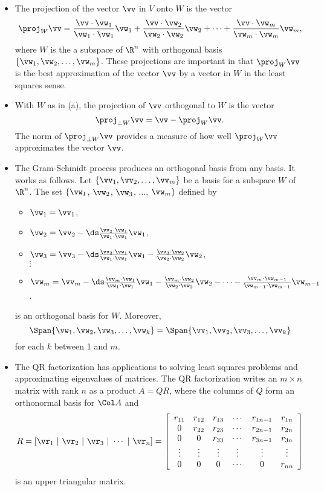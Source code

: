 \label{sec:gram_schmidt_summ}
\begin{itemize}
\item The projection of the vector $\vv$ in $V$ onto $W$ is the vector
\[\proj_W \vv = \frac{\vv \cdot \vw_1}{\vw_1 \cdot \vw_1} \vw_1 + \frac{\vv \cdot \vw_2}{\vw_2 \cdot \vw_2}  \vw_2 + \cdots + \frac{\vv \cdot \vw_m}{\vw_m \cdot \vw_m}  \vw_m,\]
where $W$ is the a subspace of $\R^n$ with orthogonal basis $\{\vw_1, \vw_2, \ldots, \vw_m\}$. These projections are important in that $\proj_W \vv$ is the best approximation of the vector $\vv$ by a vector in $W$ in the least squares sense.  
\item With $W$ as in (a), the projection of $\vv$ orthogonal to $W$ is the vector
\[\proj_{\perp W} \vv = \vv - \proj_W \vv.\]
The norm of $\proj_{\perp W} \vv$ provides a measure of how well $\proj_W \vv$ approximates the vector $\vv$. 
\item The Gram-Schmidt process produces an orthogonal basis from any basis. It works as follows. Let $\{\vv_1, \vv_2, \ldots, \vv_m\}$ be a basis for a subspace $W$ of $\R^n$. The set $\{\vw_1$, $\vw_2$, $\vw_3$, $\ldots$, $\vw_{m}\}$ defined by
\begin{itemize}
\item $\vw_1 = \vv_1$,
\item $\vw_2 = \vv_2 - \ds \frac{\vv_2 \cdot \vw_1}{\vw_1 \cdot \vw_1} \vw_1$,
\item $\vw_3 =  \vv_3 - \ds \frac{ \vv_3 \cdot  \vw_1 }{ \vw_1 \cdot  \vw_1 } \vw_1 - \frac{ \vv_3 \cdot  \vw_2 }{ \vw_2 \cdot  \vw_2 } \vw_2$, \\
\qquad $\vdots$
\item $\vw_m = \vv_m - \ds \frac{ \vv_m \cdot  \vw_1 }{ \vw_1 \cdot  \vw_1 } \vw_1 - \frac{ \vv_m \cdot  \vw_2 }{ \vw_2 \cdot  \vw_2 } \vw_2 - \cdots - \frac{ \vv_m \cdot \vw_{m-1} }{ \vw_{m-1} \cdot  \vw_{m-1} } \vw_{m-1}$.
\end{itemize}
is an orthogonal basis for $W$. Moreover,
\[\Span\{\vw_1, \vw_2, \vw_3, \ldots, \vw_{k}\} = \Span\{\vv_1,\vv_2,\vv_3, \ldots, \vv_{k}\}\]
for each $k$ between 1 and $m$.
\item The QR factorization has applications to solving least squares problems and approximating eigenvalues of matrices. The QR factorization writes an $m \times n$ matrix with rank $n$ as a product $A = QR$, where the columns of $Q$ form an orthonormal basis for $\Col A$ and
\[R = [\vr_1 \ | \ \vr_2 \ | \ \vr_3 \ | \ \cdots \ | \ \vr_n ] = \left[ \begin{array}{cccccc} r_{11}&r_{12}&r_{13}& \cdots &r_{1n-1}&r_{1n} \\ 0&r_{22}&r_{23}& \cdots &r_{2n-1}&r_{2n} \\ 0&0&r_{33}& \cdots &r_{3n-1}&r_{3n} \\ \vdots&\vdots &\vdots &\vdots &\vdots &\vdots \\ 0&0&0& \cdots &0&r_{nn} \end{array} \right]\]
is an upper triangular matrix. 
\end{itemize}



